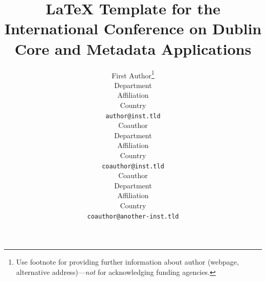 \documentclass{article}
\begin{document}
\title{\LaTeX{} Template for the International Conference on Dublin Core and Metadata Applications}

%

\author{%
  First Author\thanks{Use footnote for providing further information
    about author (webpage, alternative address)---\emph{not} for acknowledging
    funding agencies.} \\
  Department \\
  Affiliation\\
  Country \\
  \texttt{author@inst.tld} \\
  \And
  Coauthor \\
  Department \\
  Affiliation \\
  Country \\
  \texttt{coauthor@inst.tld} \\
  \And
  Coauthor \\
  Department \\
  Affiliation \\
  Country \\
  \texttt{coauthor@another-inst.tld} \\
}
\end{document}
